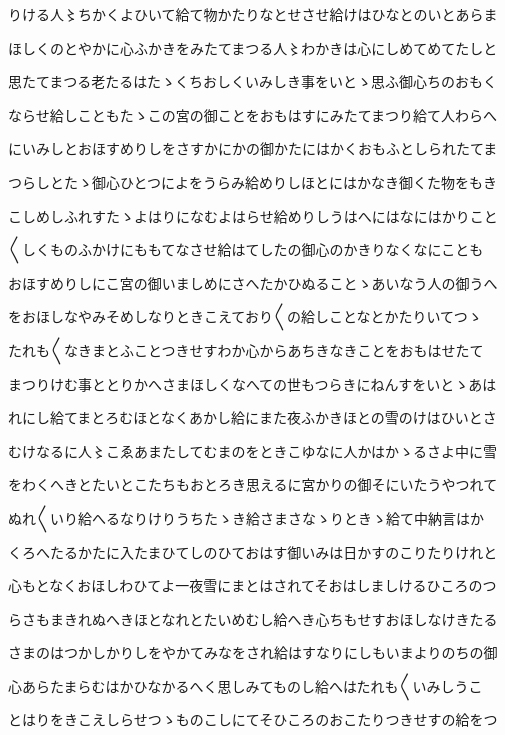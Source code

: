 \documentclass[a4paper,11pt,landscape]{ltjtarticle}
\begin{document}
りける人〻ちかくよひいて給て物かたりなとせさせ給けはひなとのいとあらま
\par\medskip
ほしくのとやかに心ふかきをみたてまつる人〻わかきは心にしめてめてたしと
\par\medskip
思たてまつる老たるはたゝくちおしくいみしき事をいとゝ思ふ御心ちのおもく
\par\medskip
ならせ給しこともたゝこの宮の御ことをおもはすにみたてまつり給て人わらへ
\par\medskip
にいみしとおほすめりしをさすかにかの御かたにはかくおもふとしられたてま
\par\medskip
つらしとたゝ御心ひとつによをうらみ給めりしほとにはかなき御くた物をもき
\par\medskip
こしめしふれすたゝよはりになむよはらせ給めりしうはへにはなにはかりこと
\par\medskip
〱しくものふかけにももてなさせ給はてしたの御心のかきりなくなにことも
\par\medskip
おほすめりしにこ宮の御いましめにさへたかひぬることゝあいなう人の御うへ
\par\medskip
をおほしなやみそめしなりときこえており〱の給しことなとかたりいてつゝ
\par\medskip
たれも〱なきまとふことつきせすわか心からあちきなきことをおもはせたて
\par\medskip
まつりけむ事ととりかへさまほしくなへての世もつらきにねんすをいとゝあは
\par\medskip
れにし給てまとろむほとなくあかし給にまた夜ふかきほとの雪のけはひいとさ
\par\medskip
むけなるに人〻こゑあまたしてむまのをときこゆなに人かはかゝるさよ中に雪
\par\medskip
をわくへきとたいとこたちもおとろき思えるに宮かりの御そにいたうやつれて
\par\medskip
ぬれ〱いり給へるなりけりうちたゝき給さまさなゝりときゝ給て中納言はか
\par\medskip
くろへたるかたに入たまひてしのひておはす御いみは日かすのこりたりけれと
\par\medskip
心もとなくおほしわひてよ一夜雪にまとはされてそおはしましけるひころのつ
\par\medskip
らさもまきれぬへきほとなれとたいめむし給へき心ちもせすおほしなけきたる
\par\medskip
さまのはつかしかりしをやかてみなをされ給はすなりにしもいまよりのちの御
\par\medskip
心あらたまらむはかひなかるへく思しみてものし給へはたれも〱いみしうこ
\par\medskip
とはりをきこえしらせつゝものこしにてそひころのおこたりつきせすの給をつ
\end{document}
